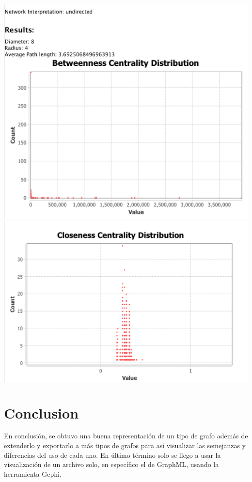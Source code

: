 \documentclass{article}
\begin{document}
\begin{center}
\includegraphics[scale=.2]{BCD.png}
\includegraphics[scale=.2]{CCD.png}
\end{center}


\section{Conclusion}
En conclusión, se obtuvo una buena representación de un tipo de grafo además de extenderlo y exportarlo a más tipos de grafos para así visualizar las semejanzas y diferencias del uso de cada uno. En último término solo se llego a usar la visualización de un archivo solo, en específico el de GraphML, usando la herramienta  Gephi.
\end{document}
